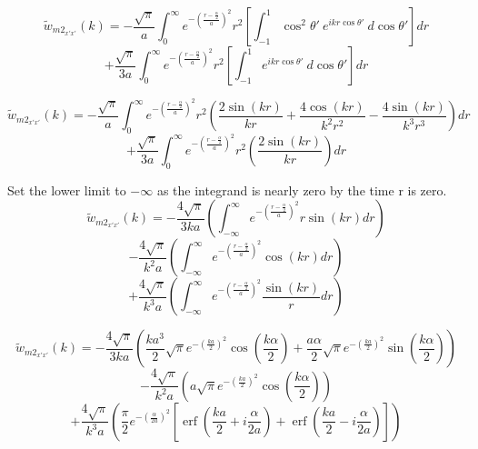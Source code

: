 \documentclass[double,12pt]{beavtex}
\begin{document}
\begin{displaymath}{\widetilde{w}_{{m2}_{x'x'}}(k)=-\frac{\sqrt{\pi}}{a}\int_{0}^{\infty}e^{-\left(\frac{r-\frac{\alpha}{2}}{a}\right)^2}r^2\left[\int_{-1}^{1}\cos^2\theta'~e^{ikr\cos\theta'}~d{\cos\theta'}\right]d{r}}\end{displaymath} 
\begin{equation}\label{compare_equation}{+\frac{\sqrt{\pi}}{3a}\int_{0}^{\infty}e^{-\left(\frac{r-\frac{\alpha}{2}}{a}\right)^2}r^2\left[\int_{-1}^{1}e^{ikr\cos\theta'}~d{\cos\theta'}\right]d{r}}\end{equation}

\begin{displaymath}{\widetilde{w}_{{m2}_{x'x'}}(k)=-\frac{\sqrt{\pi}}{a}\int_{0}^{\infty}e^{-\left(\frac{r-\frac{\alpha}{2}}{a}\right)^2}r^2\left(\frac{2\sin(kr)}{kr}+\frac{4\cos(kr)}{k^2r^2}-\frac{4\sin(kr)}{k^3r^3}\right)d{r}}\end{displaymath} 
\begin{equation}{+\frac{\sqrt{\pi}}{3a}\int_{0}^{\infty}e^{-\left(\frac{r-\frac{\alpha}{2}}{a}\right)^2}r^2\left(\frac{2\sin(kr)}{kr}\right)d{r}}\end{equation}

Set the lower limit to $-\infty$ as the integrand is nearly zero by the time r is zero. 
\begin{displaymath}{\widetilde{w}_{{m2}_{x'x'}}(k)=-\frac{4\sqrt{\pi}}{3ka}\left(\int_{-\infty}^{\infty}e^{-\left(\frac{r-\frac{\alpha}{2}}{a}\right)^2}r\sin(kr)d{r}\right)}\end{displaymath} 
\begin{displaymath}{-\frac{4\sqrt{\pi}}{k^2a}\left(\int_{-\infty}^{\infty}e^{-\left(\frac{r-\frac{\alpha}{2}}{a}\right)^2}\cos(kr)d{r}\right)}\end{displaymath} 
\begin{equation}{+\frac{4\sqrt{\pi}}{k^3a}\left(\int_{-\infty}^{\infty}e^{-\left(\frac{r-\frac{\alpha}{2}}{a}\right)^2}\frac{\sin(kr)}{r}d{r}\right)}\end{equation} 

\begin{displaymath}{\widetilde{w}_{{m2}_{x'x'}}(k)=-\frac{4\sqrt{\pi}}{3ka}\left(\frac{ka^3}{2}\sqrt{\pi}e^{-\left(\frac{ka}{2}\right)^2}\cos(\frac{k\alpha}{2})+\frac{a\alpha}{2}\sqrt{\pi}e^{-\left(\frac{ka}{2}\right)^2}\sin(\frac{k\alpha}{2})\right)}\end{displaymath} 
\begin{displaymath}{-\frac{4\sqrt{\pi}}{k^2a}\left(a\sqrt{\pi}e^{-\left(\frac{ka}{2}\right)^2}\cos(\frac{k\alpha}{2})\right)}\end{displaymath} 
\begin{equation}{+\frac{4\sqrt{\pi}}{k^3a}\left(\frac{\pi}{2}e^{-\left(\frac{\alpha}{2a}\right)^2}\left[\operatorname{erf}\left(\frac{ka}{2}+i\frac{\alpha}{2a}\right)+\operatorname{erf}\left(\frac{ka}{2}-i\frac{\alpha}{2a}\right)\right]\right)}\end{equation} 
\end{document}
